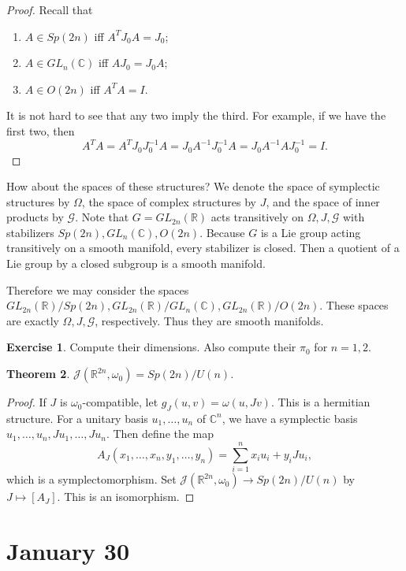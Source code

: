 \documentclass[leqno, openany]{memoir}
\newtheorem{thm}{Theorem}[chapter]
\theoremstyle{definition}
\newtheorem{exer}[thm]{Exercise}
\theoremstyle{remark}
\theoremstyle{plain}
\theoremstyle{definition}
\theoremstyle{remark}
\newcommand{\R}{\mathbb{R}}
\renewcommand{\C}{\mathbb{C}}
\newcommand{\mc}[1]{\mathcal{#1}}
\begin{document}
\begin{proof}
    Recall that
    \begin{enumerate}
        \item $A \in Sp(2n)$ iff $A^TJ_0A = J_0$;
        \item $A \in GL_n(\C)$ iff $AJ_0 = J_0A$;
        \item $A \in O(2n)$ iff $A^TA = I$.
    \end{enumerate}
    It is not hard to see that any two imply the third.
    For example, if we have the first two, then 
    \[A^TA = A^TJ_0J_0^{-1}A = J_0A^{-1}J_0^{-1}A = J_0A^{-1}AJ_0^{-1} = I.\]
\end{proof}

How about the spaces of these structures? We denote the space of symplectic structures by $\Omega$, the space of complex structures by $J$, and the space of inner products by $\mc{G}$. Note that $G = GL_{2n}(\R)$ acts transitively on $\Omega, J, \mc{G}$ with stabilizers $Sp(2n), GL_{n}(\C), O(2n)$. Because $G$ is a Lie group acting transitively on a smooth manifold, every stabilizer is closed. Then a quotient of a Lie group by a closed subgroup is a smooth manifold.

Therefore we may consider the spaces $GL_{2n}(\R)/Sp(2n), GL_{2n}(\R)/GL_n(\C), GL_{2n}(\R)/O(2n)$. These spaces are exactly $\Omega, J, \mc{G}$, respectively. Thus they are smooth manifolds.

\begin{exer}
    Compute their dimensions. Also compute their $\pi_0$ for $n = 1,2$.
\end{exer}

\begin{thm}
    $\mc{J}(\R^{2n}, \omega_0) = Sp(2n)/U(n)$.
\end{thm}

\begin{proof}
    If $J$ is $\omega_0$-compatible, let $g_J(u,v) = \omega(u, Jv)$. This is a hermitian structure. For a unitary basis $u_1, \ldots, u_n$ of $\C^n$, we have a symplectic basis $u_1, \ldots, u_n, Ju_1, \ldots, Ju_n$. Then define the map
    \[A_J(x_1, \ldots, x_n, y_1, \ldots, y_n) = \sum_{i=1}^n x_iu_i + y_iJu_i, \]
    which is a symplectomorphism. Set $\mc{J}(\R^{2n}, \omega_0) \to Sp(2n)/U(n)$ by $J \mapsto [A_J]$. This is an isomorphism.
\end{proof}

\chapter{January 30}%
\label{cha:january_30}
\end{document}
